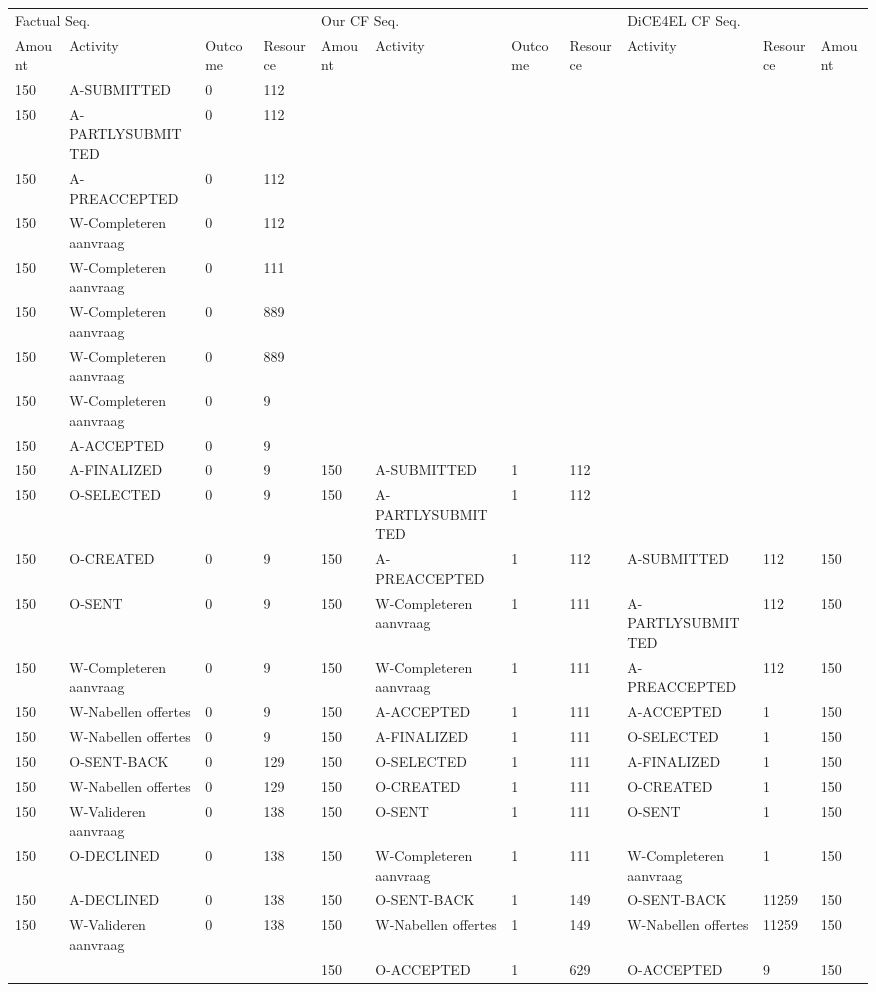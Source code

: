 \begin{tabular}{lllllllllll}
\toprule
\multicolumn{4}{l}{Factual Seq.} & \multicolumn{4}{l}{Our CF Seq.} & \multicolumn{3}{l}{DiCE4EL CF Seq.} \\
Amount & Activity & Outcome & Resource & Amount & Activity & Outcome & Resource & Activity & Resource & Amount \\
\midrule
150 & A-SUBMITTED & 0 & 112 &  &  &  &  &  &  &  \\
150 & A-PARTLYSUBMITTED & 0 & 112 &  &  &  &  &  &  &  \\
150 & A-PREACCEPTED & 0 & 112 &  &  &  &  &  &  &  \\
150 & W-Completeren aanvraag & 0 & 112 &  &  &  &  &  &  &  \\
150 & W-Completeren aanvraag & 0 & 111 &  &  &  &  &  &  &  \\
150 & W-Completeren aanvraag & 0 & 889 &  &  &  &  &  &  &  \\
150 & W-Completeren aanvraag & 0 & 889 &  &  &  &  &  &  &  \\
150 & W-Completeren aanvraag & 0 & 9 &  &  &  &  &  &  &  \\
150 & A-ACCEPTED & 0 & 9 &  &  &  &  &  &  &  \\
150 & A-FINALIZED & 0 & 9 & 150 & A-SUBMITTED & 1 & 112 &  &  &  \\
150 & O-SELECTED & 0 & 9 & 150 & A-PARTLYSUBMITTED & 1 & 112 &  &  &  \\
150 & O-CREATED & 0 & 9 & 150 & A-PREACCEPTED & 1 & 112 & A-SUBMITTED & 112 & 150 \\
150 & O-SENT & 0 & 9 & 150 & W-Completeren aanvraag & 1 & 111 & A-PARTLYSUBMITTED & 112 & 150 \\
150 & W-Completeren aanvraag & 0 & 9 & 150 & W-Completeren aanvraag & 1 & 111 & A-PREACCEPTED & 112 & 150 \\
150 & W-Nabellen offertes & 0 & 9 & 150 & A-ACCEPTED & 1 & 111 & A-ACCEPTED & 1 & 150 \\
150 & W-Nabellen offertes & 0 & 9 & 150 & A-FINALIZED & 1 & 111 & O-SELECTED & 1 & 150 \\
150 & O-SENT-BACK & 0 & 129 & 150 & O-SELECTED & 1 & 111 & A-FINALIZED & 1 & 150 \\
150 & W-Nabellen offertes & 0 & 129 & 150 & O-CREATED & 1 & 111 & O-CREATED & 1 & 150 \\
150 & W-Valideren aanvraag & 0 & 138 & 150 & O-SENT & 1 & 111 & O-SENT & 1 & 150 \\
150 & O-DECLINED & 0 & 138 & 150 & W-Completeren aanvraag & 1 & 111 & W-Completeren aanvraag & 1 & 150 \\
150 & A-DECLINED & 0 & 138 & 150 & O-SENT-BACK & 1 & 149 & O-SENT-BACK & 11259 & 150 \\
150 & W-Valideren aanvraag & 0 & 138 & 150 & W-Nabellen offertes & 1 & 149 & W-Nabellen offertes & 11259 & 150 \\
 &  &  &  & 150 & O-ACCEPTED & 1 & 629 & O-ACCEPTED & 9 & 150 \\
\bottomrule
\end{tabular}
